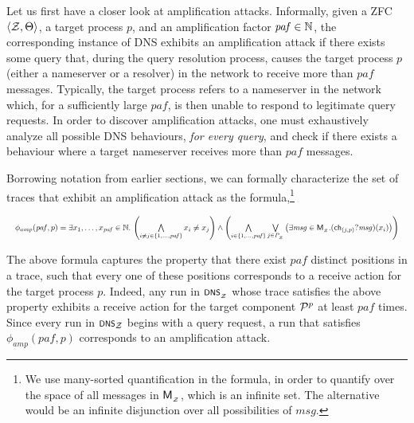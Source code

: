 Let us first have a closer look at amplification attacks. Informally, given a ZFC $\tup{\cal Z, \Theta}$, a target process $p$, and an amplification factor $\mathit{paf} \in \nat$, the corresponding instance of DNS exhibits an amplification attack if there exists some query that, during the query resolution process, causes the target process $p$ (either a nameserver or a resolver) in the network to receive more than $\mathit{paf}$ messages. Typically, the target process refers to a nameserver in the network which, for a sufficiently large $\mathit{paf}$, is then unable to respond to legitimate query requests. In order to discover amplification attacks, one must exhaustively analyze all possible DNS behaviours, \emph{for every query}, and check if there exists a behaviour where a target nameserver receives more than $\mathit{paf}$ messages.

Borrowing notation from earlier sections, we can formally characterize the set of traces that exhibit an amplification attack as the formula,\footnote{We use many-sorted quantification in the formula, in order to quantify over the space of all messages in $\mathsf{M}\subsub{\cal Z}$, which is an infinite set. The alternative would be an infinite disjunction over all possibilities of $\mathit{msg}$.}

\begin{equation*}\label{eqn:amp-prop}
\resizebox{\textwidth}{!}{$\phi_{amp}(\mathit{paf},p) = \exists x_1,\ldots,x_{\mathit{paf}}\in \nat.\, \left(\bigwedge\limits_{i\neq j \in \{1,\ldots ,\mathit{paf} \}} x_i \neq x_j\right)  \wedge \left( \bigwedge\limits_{i\in \{1,\ldots , \mathit{paf} \}}\bigvee\limits_{j \in P\subsub{\cal Z}} \left(\exists \mathit{msg}\in \mathsf M\subsub{\cal Z}.(\ch_{(j,p)}?\mathit{msg})(x_i)\right) \right)$}
\end{equation*}


The above formula captures the property that there exist $\mathit{paf}$ distinct positions in a trace, such that every one of these positions corresponds to a receive action for the target process $p$. Indeed, any run in $\scrsf{dns}\subsub{\cal Z}$ whose trace satisfies the above property exhibits a receive action for the target component $\cal P^p$ at least $\mathit{paf}$ times. Since every run in $\scrsf{dns}_{\cal Z}$ begins with a query request, a run that satisfies $\phi_{amp}(\mathit{paf},p)$ corresponds to an amplification attack.

